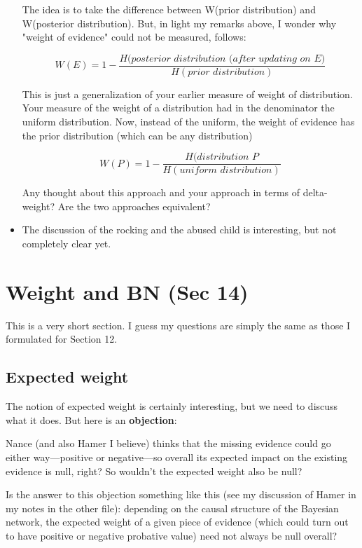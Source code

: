 \documentclass[
  10pt,
  dvipsnames,enabledeprecatedfontcommands]{scrartcl}
\begin{document}
\begin{itemize}
The idea is to take the difference between W(prior distribution) and W(posterior distribution). But, in light my remarks above, I wonder why "weight of evidence" could not be measured, follows:

\[W(E) = 1 - \frac{H(\textit{posterior distribution (after updating on E)}}{H(\textit{prior distribution})}\]

This is just a generalization of your earlier measure of weight of distribution. Your measure of the weight of a distribution had in the denominator  the uniform distribution. Now, instead of the uniform, the weight of evidence has the prior distribution (which can be any distribution)

\[W(P) = 1 - \frac{H(\textit{distribution P}}{H(\textit{uniform distribution})}\]

Any thought about this approach and your approach in 
terms of delta-weight? Are the two approaches equivalent?

\item The discussion of the rocking and the abused child is interesting, but not completely clear yet.

\end{itemize}

\hypertarget{weight-and-bn-sec-14}{%
\section{Weight and BN (Sec 14)}\label{weight-and-bn-sec-14}}

This is a very short section. I guess my questions are simply the same
as those I formulated for Section 12.

\hypertarget{expected-weight}{%
\subsection{Expected weight}\label{expected-weight}}

The notion of expected weight is certainly interesting, but we need to
discuss what it does. But here is an \textbf{objection}:

Nance (and also Hamer I believe) thinks that the missing evidence could
go either way---positive or negative---so overall its expected impact on
the existing evidence is null, right? So wouldn't the expected weight
also be null?

Is the answer to this objection something like this (see my discussion
of Hamer in my notes in the other file): depending on the causal
structure of the Bayesian network, the expected weight of a given piece
of evidence (which could turn out to have positive or negative probative
value) need not always be null overall?
\end{document}
